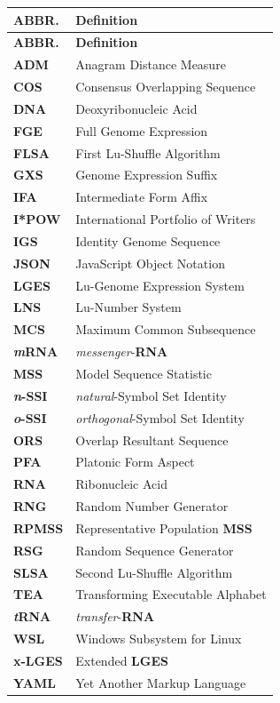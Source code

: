 \documentclass[a4paper, 18pt]{book} %
\begin{document}
\begin{longtable}{p{3cm} p{12cm}}
\textbf{ABBR.} & \textbf{Definition} \\
\hline
\endfirsthead

\textbf{ABBR.} & \textbf{Definition} \\
\hline
\endhead

\textbf{ADM} & Anagram Distance Measure \\
\textbf{COS} & Consensus Overlapping Sequence \\
\textbf{DNA} & Deoxyribonucleic Acid \\
\textbf{FGE} & Full Genome Expression \\
\textbf{FLSA} & First Lu-Shuffle Algorithm \\
\textbf{GXS} & Genome Expression Suffix \\
\textbf{IFA} & Intermediate Form Affix \\
\textbf{I*POW} & International Portfolio of Writers \\
\textbf{IGS} & Identity Genome Sequence \\
\textbf{JSON} & JavaScript Object Notation \\
\textbf{LGES} & Lu-Genome Expression System \\
\textbf{LNS} & Lu-Number System\\
\textbf{MCS} & Maximum Common Subsequence \\
\textbf{\textit{m}RNA} & \textit{messenger}-\textbf{RNA} \\
\textbf{MSS} & Model Sequence Statistic \\
\textbf{\textit{n}-SSI} & \textit{natural}-Symbol Set Identity \\
\textbf{\textit{o}-SSI} & \textit{orthogonal}-Symbol Set Identity \\
\textbf{ORS} & Overlap Resultant Sequence \\
\textbf{PFA} & Platonic Form Aspect \\
\textbf{RNA} & Ribonucleic Acid  \\
\textbf{RNG} & Random Number Generator  \\
\textbf{RPMSS} & Representative Population \textbf{MSS}  \\
\textbf{RSG} & Random Sequence Generator  \\
\textbf{SLSA} & Second Lu-Shuffle Algorithm  \\
\textbf{TEA} & Transforming Executable Alphabet \\
\textbf{\textit{t}RNA} & \textit{transfer}-\textbf{RNA} \\
\textbf{WSL} & Windows Subsystem for Linux\\
\textbf{x-LGES} & Extended \textbf{LGES} \\
\textbf{YAML} & Yet Another Markup Language \\


\end{longtable}
\end{document}
